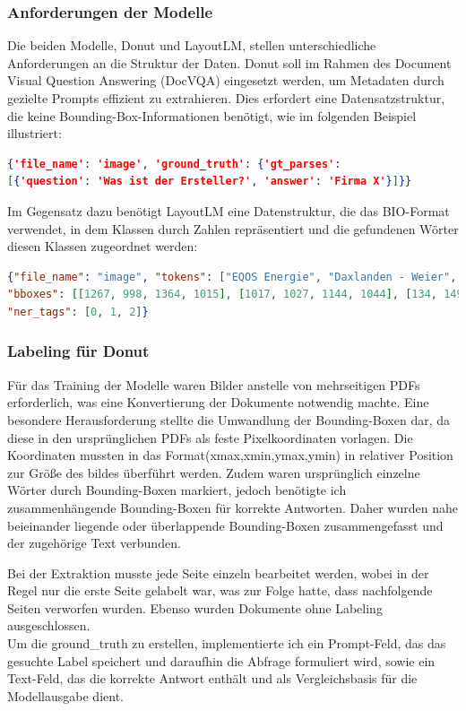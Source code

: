 \documentclass[12pt,a4paper,twoside]{article}
\begin{document}
\subsubsection{Anforderungen der Modelle}
Die beiden Modelle, Donut und LayoutLM, stellen unterschiedliche Anforderungen an die Struktur der Daten. Donut soll im Rahmen des Document Visual Question Answering (DocVQA) eingesetzt werden, um Metadaten durch gezielte Prompts effizient zu extrahieren. Dies erfordert eine Datensatzstruktur, die keine Bounding-Box-Informationen benötigt, wie im folgenden Beispiel illustriert:
\begin{lstlisting}[language=json,firstnumber=1]
{'file_name': 'image', 'ground_truth': {'gt_parses': 
[{'question': 'Was ist der Ersteller?', 'answer': 'Firma X'}]}}
\end{lstlisting}
Im Gegensatz dazu benötigt LayoutLM eine Datenstruktur, die das BIO-Format verwendet, in dem Klassen durch Zahlen repräsentiert und die gefundenen Wörter diesen Klassen zugeordnet werden:
\begin{lstlisting}[language=json,firstnumber=1]
{"file_name": "image", "tokens": ["EQOS Energie", "Daxlanden - Weier", "Baugrunderkundung"], 
"bboxes": [[1267, 998, 1364, 1015], [1017, 1027, 1144, 1044], [134, 149, 368, 175]], 
"ner_tags": [0, 1, 2]}
\end{lstlisting}

\subsubsection{Labeling für Donut}
Für das Training der Modelle waren Bilder anstelle von mehrseitigen PDFs erforderlich, was eine Konvertierung der Dokumente notwendig machte. Eine besondere Herausforderung stellte die Umwandlung der Bounding-Boxen dar, da diese in den ursprünglichen PDFs als feste Pixelkoordinaten vorlagen. Die Koordinaten mussten in das Format(xmax,xmin,ymax,ymin) in relativer Position zur Größe des bildes überführt werden. Zudem waren ursprünglich einzelne Wörter durch Bounding-Boxen markiert, jedoch benötigte ich zusammenhängende Bounding-Boxen für korrekte Antworten. Daher wurden nahe beieinander liegende oder überlappende Bounding-Boxen zusammengefasst und der zugehörige Text verbunden.

Bei der Extraktion musste jede Seite einzeln bearbeitet werden, wobei in der Regel nur die erste Seite gelabelt war, was zur Folge hatte, dass nachfolgende Seiten verworfen wurden. Ebenso wurden Dokumente ohne Labeling ausgeschlossen.\\
Um die ground\_truth zu erstellen, implementierte ich ein Prompt-Feld, das das gesuchte Label speichert und daraufhin die Abfrage formuliert wird, sowie ein Text-Feld, das die korrekte Antwort enthält und als Vergleichsbasis für die Modellausgabe dient.
\end{document}
